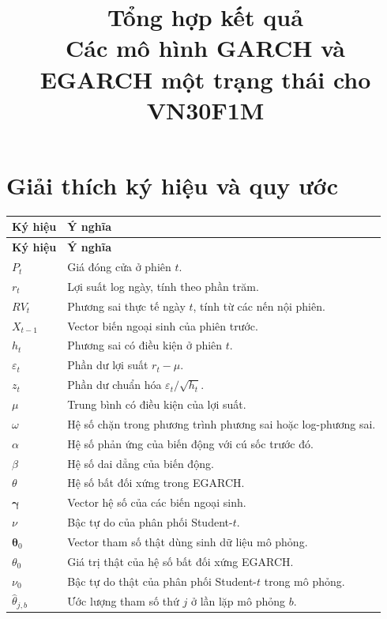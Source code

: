 \documentclass[11pt,a4paper]{article}
\title{\vspace{-1.2cm}\textbf{Tổng hợp kết quả}\\[0.2em]\large Các mô hình GARCH và EGARCH một trạng thái cho VN30F1M}
\author{}
\date{}
\begin{document}
\maketitle
\vspace{-1.2cm}
\tableofcontents
\clearpage


\section{Giải thích ký hiệu và quy ước}
\small
\renewcommand{\arraystretch}{1.00}
\begin{longtable}{@{}p{}p{}@{}}
\toprule
\textbf{Ký hiệu} & \textbf{Ý nghĩa} \\
\midrule
\endfirsthead
\toprule
\textbf{Ký hiệu} & \textbf{Ý nghĩa} \\
\midrule
\endhead
$P_t$ & Giá đóng cửa ở phiên $t$. \\
$r_t$ & Lợi suất log ngày, tính theo phần trăm. \\
$RV_t$ & Phương sai thực tế ngày $t$, tính từ các nến nội phiên. \\
$X_{t-1}$ & Vector biến ngoại sinh của phiên trước. \\
$h_t$ & Phương sai có điều kiện ở phiên $t$. \\
$\varepsilon_t$ & Phần dư lợi suất $r_t-\mu$. \\
$z_t$ & Phần dư chuẩn hóa $\varepsilon_t/\sqrt{h_t}$. \\
$\mu$ & Trung bình có điều kiện của lợi suất. \\
$\omega$ & Hệ số chặn trong phương trình phương sai hoặc log-phương sai. \\
$\alpha$ & Hệ số phản ứng của biến động với cú sốc trước đó. \\
$\beta$ & Hệ số dai dẳng của biến động. \\
$\theta$ & Hệ số bất đối xứng trong EGARCH. \\
$\boldsymbol\gamma$ & Vector hệ số của các biến ngoại sinh. \\
$\nu$ & Bậc tự do của phân phối Student-$t$. \\
$\boldsymbol\theta_0$ & Vector tham số thật dùng sinh dữ liệu mô phỏng. \\
$\theta_0$ & Giá trị thật của hệ số bất đối xứng EGARCH. \\
$\nu_0$ & Bậc tự do thật của phân phối Student-$t$ trong mô phỏng. \\
$\hat\theta_{j,b}$ & Ước lượng tham số thứ $j$ ở lần lặp mô phỏng $b$. \\

\end{longtable}
\end{document}
